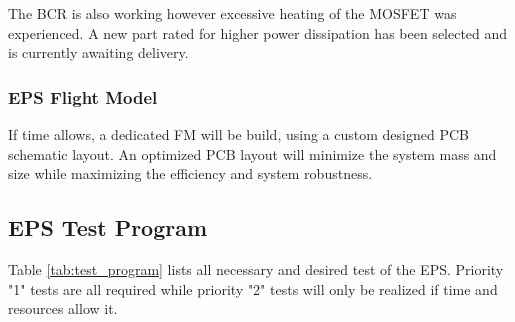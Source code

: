 The \ac{BCR} is also working however excessive heating of the MOSFET was experienced. A new part rated for higher power dissipation has been selected and is currently awaiting delivery.
%
\subsubsection{EPS Flight Model}
If time allows, a dedicated \ac{FM} will be build, using a custom designed \ac{PCB} schematic layout. An optimized \ac{PCB} layout will minimize the system mass and size while maximizing the efficiency and system robustness.
%
\subsection{EPS Test Program}
Table \ref{tab:test_program} lists all necessary and desired test of the EPS. Priority "1" tests are all required while priority "2" tests will only be realized if time and resources allow it.
%
